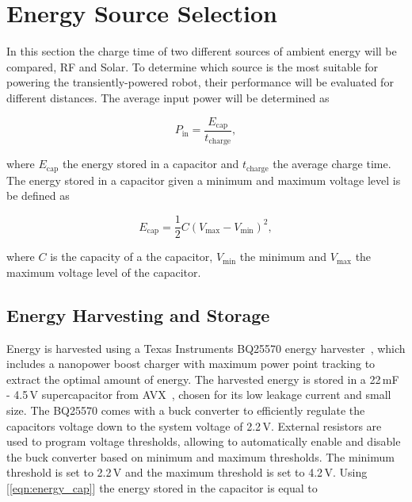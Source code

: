 \section{Energy Source Selection}
\label{sec:pre_energy_source_selection}

In this section the charge time of two different sources of ambient energy will be compared, RF and Solar.
To determine which source is the most suitable for powering the transiently-powered robot, their performance will be evaluated for different distances.
The average input power will be determined as

\begin{equation}
	P_{\text{in}} = \frac{E_{\text{cap}}}{t_{\text{charge}}},
\end{equation}

\noindent
where $E_{\text{cap}}$ the energy stored in a capacitor and $t_{\text{charge}}$ the average charge time.
The energy stored in a capacitor given a minimum and maximum voltage level is be defined as

\begin{equation}
\label{eqn:energy_cap}
	E_{\text{cap}} = \frac{1}{2}C(V_{\max} - V_{\min})^{2},
\end{equation}

\noindent
where $C$ is the capacity of a the capacitor, $V_{\min}$ the minimum and $V_{\max}$ the maximum voltage level of the capacitor.

\subsection{Energy Harvesting and Storage}
\label{sec:pre_energy_harvesting_storage}
Energy is harvested using a Texas Instruments BQ25570 energy harvester~\cite{bq25570_2017}, which includes a nanopower boost charger with maximum power point tracking to extract the optimal amount of energy. 
The harvested energy is stored in a 22\,mF - 4.5\,V supercapacitor from AVX~\cite{avx_bestcap_2017}, chosen for its low leakage current and small size.
The BQ25570 comes with a buck converter to efficiently regulate the capacitors voltage down to the system voltage of 2.2\,V.
External resistors are used to program voltage thresholds, allowing to automatically enable and disable the buck converter based on minimum and maximum thresholds.
The minimum threshold is set to 2.2\,V and the maximum threshold is set to 4.2\,V.
Using [\ref{eqn:energy_cap}] the energy stored in the capacitor is equal to

